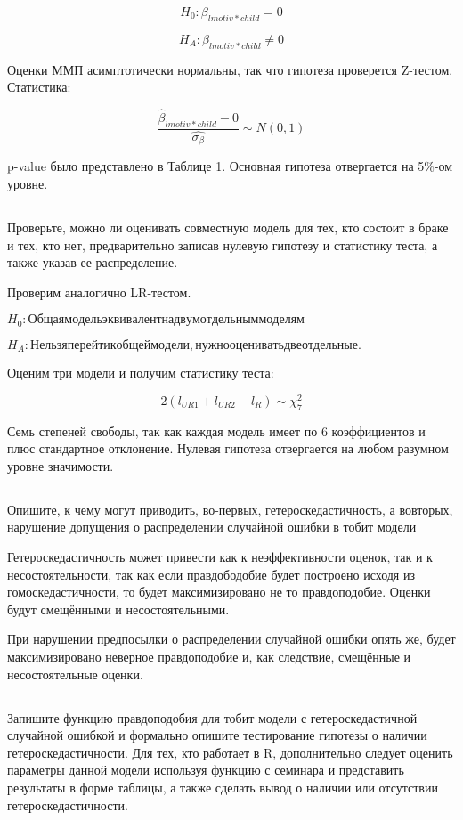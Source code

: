 \documentclass[a4paper,12pt]{article}
\begin{document}
\[  H_0: \beta_{lmotiv*child} = 0  \]

\[ H_A: \beta_{lmotiv*child} \neq 0  \]

Оценки ММП асимптотически нормальны, так что гипотеза проверется Z-тестом.  Статистика:

\[ \frac{\hat{\beta}_{lmotiv*child} - 0 }{\hat{\sigma_\beta}} \sim N(0,1)\]

p-value было представлено в Таблице 1. Основная гипотеза отвергается на 5\%-ом уровне.

\subsection{}
\Sun Проверьте, можно ли оценивать совместную модель для тех, кто состоит в браке
и тех, кто нет, предварительно записав нулевую гипотезу и статистику теста, а также указав
ее распределение.

Проверим аналогично LR-тестом.  

$ H_0: Общая модель эквивалентна двум отдельным моделям $

$ H_A: Нельзя перейти к общей модели, нужно оценивать две отдельные. $

Оценим три модели и получим статистику теста:

\[ 2(l_{UR1} + l_{UR2} - l_R) \sim \chi^2_7 \]

Семь степеней свободы, так как каждая модель имеет по 6 коэффициентов и плюс стандартное отклонение. Нулевая гипотеза отвергается на любом разумном уровне значимости.
\subsection{}

\Sun  Опишите, к чему могут приводить, во-первых, гетероскедастичность, а вовторых, нарушение допущения о распределении случайной ошибки в тобит модели


Гетероскедастичность может привести как к неэффективности оценок, так и к несостоятельности, так как если правдободобие будет построено исходя из гомоскедастичности, то будет максимизировано не то правдоподобие. Оценки будут смещёнными и несостоятельными.

При нарушении предпосылки о распределении случайной ошибки опять же, будет максимизировано неверное правдоподобие и, как следствие, смещённые и несостоятельные оценки.

\subsection{}
 Запишите функцию правдоподобия для тобит модели с гетероскедастичной
случайной ошибкой и формально опишите тестирование гипотезы о наличии
гетероскедастичности. Для тех, кто работает в R, дополнительно следует оценить
параметры данной модели используя функцию с семинара и представить результаты в
форме таблицы, а также сделать вывод о наличии или отсутствии гетероскедастичности.
\end{document}
